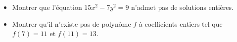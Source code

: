 \begin{itemize}
  \item Montrer que l'équation $15x^2 - 7y^2 = 9$ n'admet pas de solutions
  entières.
  \item Montrer qu'il n'existe pas de polynôme $f$ à coefficients entiers tel que
  $f(7) = 11$ et $f(11) = 13$.
\end{itemize}
